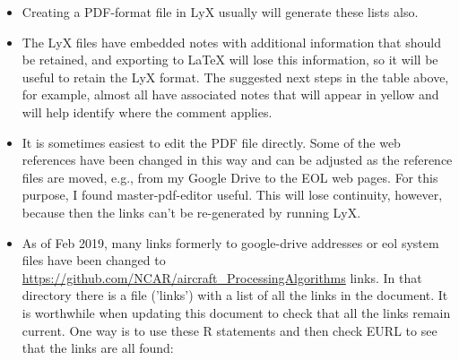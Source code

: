 \documentclass[
]{book}
\begin{document}
\begin{itemize}
  \begin{itemize}
  \item
    entries like 'wind!relative' will generate index entries as subordinate entries with 'relative' below 'wind'.
    In the Rmd version, the index is not generated automatically but the existing links should
    remain valid as the text is changed. To add a variable, use a subsection or
    subsubsection entry and identify a label by following the heading with \{\#newlabel\}.
    Then follow the pattern in the existing index to add an entry for the new term. Also add
    a similar link to the list of variables in Appendix B.
  \item
    I have tried to emphasize using nouns to start index entries, so for example I would favor ``coefficient!calibration'' over ``calibration coefficient.\\
  \item
    It is sometimes useful to generate ``see xxx'' entries, which can be done as follows in
    the LyX version: ``INS\textbar see \{Inertial Navigation System\}'' where the part in braces is also in LaTeX code, generated by pressing CNTL-L.\\
  \end{itemize}
\item
  Creating a PDF-format file in LyX usually will generate these lists also.\\
\item
  The LyX files have embedded notes with additional information that should be retained, and exporting to LaTeX will lose this information, so it will be useful to retain the LyX format. The suggested next steps in the table above, for example, almost all have associated notes that will appear in yellow and will help identify where the comment applies.\\
\item
  It is sometimes easiest to edit the PDF file directly. Some of the web references have been changed in this way and can be adjusted as the reference files are moved, e.g., from my Google Drive to the EOL web pages. For this purpose, I found master-pdf-editor useful. This will lose continuity, however, because then the links can't be re-generated by running LyX.\\
\item
  As of Feb 2019, many links formerly to google-drive addresses or eol system files have been changed to \url{https://github.com/NCAR/aircraft_ProcessingAlgorithms} links. In that directory there is a file ('links') with a list of all the links in the document. It is worthwhile when updating this document to check that all the links remain current. One way is to use these R statements and then check EURL to see that the links are all found:
\end{itemize}
\end{document}
